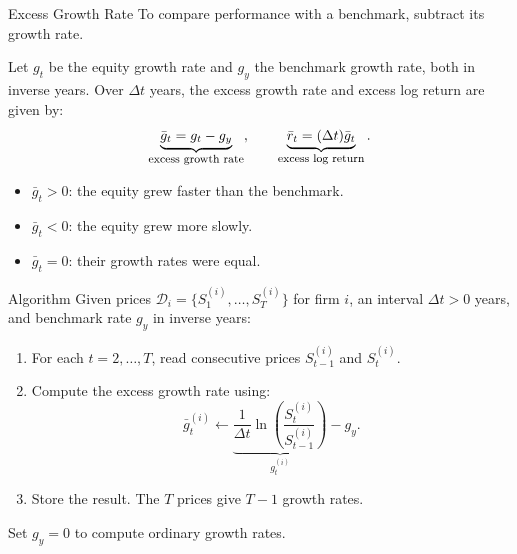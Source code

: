 \documentclass[aspectratio=169,11pt]{beamer}
\begin{document}
\begin{frame}{Excess Growth Rate}
  To compare performance with a benchmark, subtract its growth rate.

  Let $g_t$ be the equity growth rate and $g_y$ the benchmark growth rate,
  both in inverse years. Over $\Delta t$ years, the excess growth rate
  and excess log return are given by:
  \[
    \underbrace{\bar g_t=g_t-g_y}_{\text{\footnotesize excess growth rate}},
    \qquad
    \underbrace{\bar r_t=(\Delta t)\bar g_t}_{\text{\footnotesize excess log return}}.
  \]

  \vspace{0.5em}
  \begin{itemize}\setlength{\itemsep}{0.6em}
    \item $\bar g_t>0$: the equity grew faster than the benchmark.
    \item $\bar g_t<0$: the equity grew more slowly.
    \item $\bar g_t=0$: their growth rates were equal.
  \end{itemize}

\end{frame}

\begin{frame}{Algorithm}
  Given prices $\mathcal D_i=\{S_1^{(i)},\ldots,S_T^{(i)}\}$ for firm $i$,
  an interval $\Delta t>0$ years, and benchmark rate $g_y$ in inverse years:

  \vspace{0.6em}
  \begin{enumerate}\setlength{\itemsep}{0.6em}
    \item For each $t=2,\ldots,T$, read consecutive prices
      $S_{t-1}^{(i)}$ and $S_t^{(i)}$.
    \item Compute the excess growth rate using:
      \[
        \bar g_t^{(i)}\gets
        \underbrace{\frac{1}{\Delta t}\ln\!\left(\frac{S_t^{(i)}}{S_{t-1}^{(i)}}\right)}_{g_t^{(i)}}-g_y.
      \]
    \item Store the result. The $T$ prices give $T-1$ growth rates.
  \end{enumerate}

  Set $g_y=0$ to compute ordinary growth rates.
\end{frame}
\end{document}

